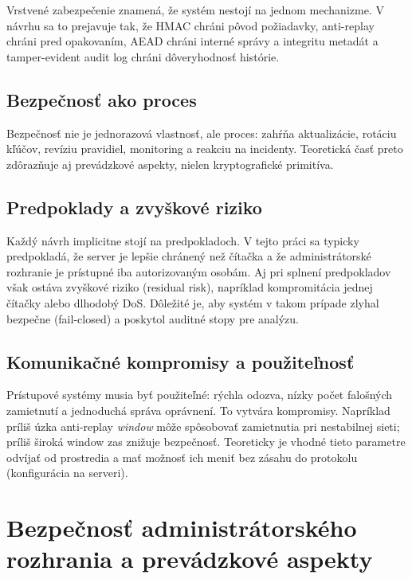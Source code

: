 \documentclass[journal,a4paper,onecolumn]{IEEEtran}
\begin{document}
Vrstvené zabezpečenie znamená, že systém nestojí na jednom mechanizme. V návrhu sa to prejavuje tak, že HMAC chráni pôvod požiadavky,\cite{FIPS1981} anti-replay chráni pred opakovaním, AEAD chráni interné správy a integritu metadát\cite{RFC8439,LibsodiumXChaChaDoc} a tamper-evident audit log chráni dôveryhodnosť histórie.\cite{SchneierKelsey1999}

\subsection{Bezpečnosť ako proces}

Bezpečnosť nie je jednorazová vlastnosť, ale proces: zahŕňa aktualizácie, rotáciu kľúčov, revíziu pravidiel, monitoring a reakciu na incidenty. Teoretická časť preto zdôrazňuje aj prevádzkové aspekty, nielen kryptografické primitíva.

\subsection{Predpoklady a zvyškové riziko}

Každý návrh implicitne stojí na predpokladoch. V tejto práci sa typicky predpokladá, že server je lepšie chránený než čítačka a že administrátorské rozhranie je prístupné iba autorizovaným osobám. Aj pri splnení predpokladov však ostáva zvyškové riziko (residual risk), napríklad kompromitácia jednej čítačky alebo dlhodobý DoS. Dôležité je, aby systém v takom prípade zlyhal bezpečne (fail-closed) a poskytol auditné stopy pre analýzu.

\subsection{Komunikačné kompromisy a použiteľnosť}

Prístupové systémy musia byť použiteľné: rýchla odozva, nízky počet falošných zamietnutí a jednoduchá správa oprávnení. To vytvára kompromisy. Napríklad príliš úzka anti-replay \emph{window} môže spôsobovať zamietnutia pri nestabilnej sieti; príliš široká window zas znižuje bezpečnosť. Teoreticky je vhodné tieto parametre odvíjať od prostredia a mať možnosť ich meniť bez zásahu do protokolu (konfigurácia na serveri).

\section{Bezpečnosť administrátorského rozhrania a prevádzkové aspekty}
\end{document}

